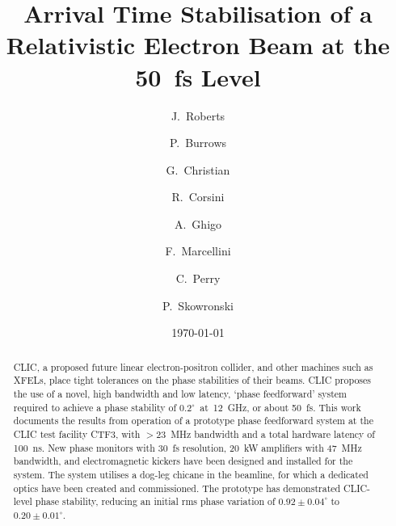 \documentclass[%
 reprint,
 superscriptaddress,
 amsmath,
 amssymb,
 prl,
]{revtex4-1}
\begin{document}
\title{Arrival Time Stabilisation of a Relativistic Electron Beam at 
the 50~fs Level}

\author{J.~Roberts}

\author{P.~Burrows}

\author{G.~Christian}

\author{R.~Corsini}

\author{A.~Ghigo}

\author{F.~Marcellini}

\author{C.~Perry}

\author{P.~Skowronski}

\date{\today}

\begin{abstract}
CLIC, a proposed future linear electron-positron collider, and other machines 
such as XFELs, place tight tolerances on the phase stabilities of their beams. 
CLIC proposes the use of a novel, high bandwidth and low latency, `phase 
feedforward' system required to achieve a phase stability of 
\(0.2^\circ\)~at~12~GHz, or about 50~fs. This work documents the results from 
operation of a prototype phase feedforward system at the CLIC test facility 
CTF3, with \(>23\)~MHz bandwidth and a total hardware latency of 100~ns. New 
phase monitors with 30~fs resolution, 20~kW amplifiers with 47~MHz bandwidth, 
and electromagnetic kickers have been designed and installed for the system. 
The system utilises a dog-leg chicane in the beamline, for which a dedicated 
optics have been created and commissioned. The prototype has demonstrated 
CLIC-level phase stability, reducing an initial rms phase variation of 
\(0.92\pm0.04^\circ\) to \(0.20\pm0.01^\circ\).
\end{abstract}
\end{document}
